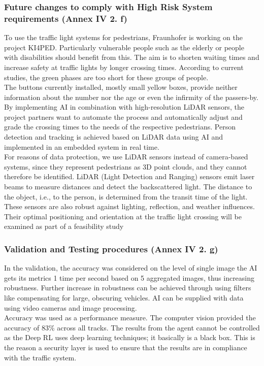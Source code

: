   \subsubsection{Future changes to comply with High Risk System requirements (Annex IV 2. f)}
  To use the traffic light systems for pedestrians, Fraunhofer is working on the project KI4PED. Particularly vulnerable people such as the elderly or people with disabilities should benefit from this. The aim is to shorten waiting times and increase safety at traffic lights by longer crossing times. According to current studies, the green phases are too short for these groups of people.\\
  The buttons currently installed, mostly small yellow boxes, provide neither information about the number nor the age or even the infirmity of the passers-by. By implementing AI in combination with high-resolution LiDAR sensors, the project partners want to automate the process and automatically adjust and grade the crossing times to the needs of the respective pedestrians. Person detection and tracking is achieved based on LiDAR data using AI and implemented in an embedded system in real time.\\
  For reasons of data protection, we use LiDAR sensors instead of camera-based systems, since they represent pedestrians as 3D point clouds, and they cannot therefore be identified. LiDAR (Light Detection and Ranging) sensors emit laser beams to measure distances and detect the backscattered light. The distance to the object, i.e., to the person, is determined from the transit time of the light. These sensors are also robust against lighting, reflection, and weather influences. Their optimal positioning and orientation at the traffic light crossing will be examined as part of a feasibility study
  \subsubsection{Validation and Testing procedures (Annex IV 2. g)}
  In the validation, the accuracy was considered on the level of single image the AI gets its metrics 1 time per second based on 5 aggregated images, thus increasing robustness. Further increase in robustness can be achieved through using filters like compensating for large, obscuring vehicles. AI can be supplied with data using video cameras and image processing. \\
  Accuracy was used as a performance measure. The computer vision provided the accuracy of 83\% across all tracks. The results from the agent cannot be controlled as the Deep RL uses deep learning techniques; it basically is a black box. This is the reason a security layer is used to ensure that the results are in compliance with the traffic system.
